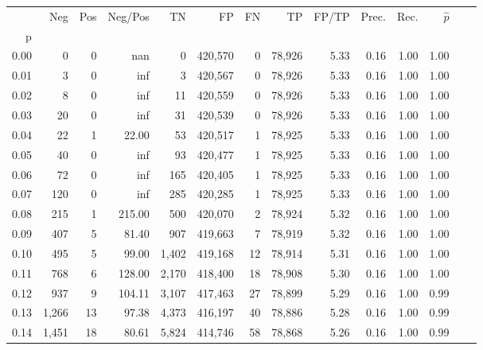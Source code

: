 \begin{tabular}{rrrrrrrrrrrrrr}
\toprule
{} &     Neg &    Pos & Neg/Pos &       TN &       FP &      FN &      TP & FP/TP & Prec. &  Rec. & $\hat{p}$ \\
p    &         &        &         &          &          &         &         &       &       &       &           \\
\midrule
0.00 &       0 &      0 &     nan &        0 &  420,570 &       0 &  78,926 &  5.33 &  0.16 &  1.00 &      1.00 \\
0.01 &       3 &      0 &     inf &        3 &  420,567 &       0 &  78,926 &  5.33 &  0.16 &  1.00 &      1.00 \\
0.02 &       8 &      0 &     inf &       11 &  420,559 &       0 &  78,926 &  5.33 &  0.16 &  1.00 &      1.00 \\
0.03 &      20 &      0 &     inf &       31 &  420,539 &       0 &  78,926 &  5.33 &  0.16 &  1.00 &      1.00 \\
0.04 &      22 &      1 &   22.00 &       53 &  420,517 &       1 &  78,925 &  5.33 &  0.16 &  1.00 &      1.00 \\
0.05 &      40 &      0 &     inf &       93 &  420,477 &       1 &  78,925 &  5.33 &  0.16 &  1.00 &      1.00 \\
0.06 &      72 &      0 &     inf &      165 &  420,405 &       1 &  78,925 &  5.33 &  0.16 &  1.00 &      1.00 \\
0.07 &     120 &      0 &     inf &      285 &  420,285 &       1 &  78,925 &  5.33 &  0.16 &  1.00 &      1.00 \\
0.08 &     215 &      1 &  215.00 &      500 &  420,070 &       2 &  78,924 &  5.32 &  0.16 &  1.00 &      1.00 \\
0.09 &     407 &      5 &   81.40 &      907 &  419,663 &       7 &  78,919 &  5.32 &  0.16 &  1.00 &      1.00 \\
0.10 &     495 &      5 &   99.00 &    1,402 &  419,168 &      12 &  78,914 &  5.31 &  0.16 &  1.00 &      1.00 \\
0.11 &     768 &      6 &  128.00 &    2,170 &  418,400 &      18 &  78,908 &  5.30 &  0.16 &  1.00 &      1.00 \\
0.12 &     937 &      9 &  104.11 &    3,107 &  417,463 &      27 &  78,899 &  5.29 &  0.16 &  1.00 &      0.99 \\
0.13 &   1,266 &     13 &   97.38 &    4,373 &  416,197 &      40 &  78,886 &  5.28 &  0.16 &  1.00 &      0.99 \\
0.14 &   1,451 &     18 &   80.61 &    5,824 &  414,746 &      58 &  78,868 &  5.26 &  0.16 &  1.00 &      0.99 \\

\end{tabular}
